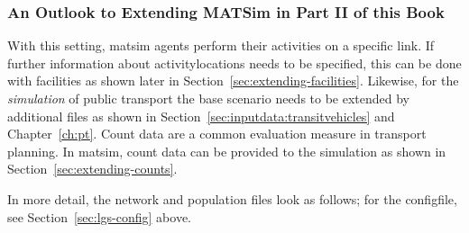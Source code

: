 \subsubsection{An Outlook to Extending MATSim in Part II of this Book}
With this setting, \gls{matsim} agents perform their activities on a specific \gls{link}. If further information about \glspl{activitylocation} needs to be specified, this can be done with facilities as shown later in Section~\ref{sec:extending-facilities}. Likewise, for the \emph{simulation} of public transport the base scenario needs to be extended by additional files as shown in Section~\ref{sec:inputdata:transitvehicles} and Chapter~\ref{ch:pt}. Count data are a common evaluation measure in transport planning. In \gls{matsim}, count data can be provided to the simulation as shown in Section~\ref{sec:extending-counts}.
 
In more detail, the network and population files look as follows; for the \gls{configfile}, see Section~\ref{sec:lgs-config} above.

\makeatletter
\newcommand\thefontsize{{The current font size is: \f@size pt\par}}
\makeatother

